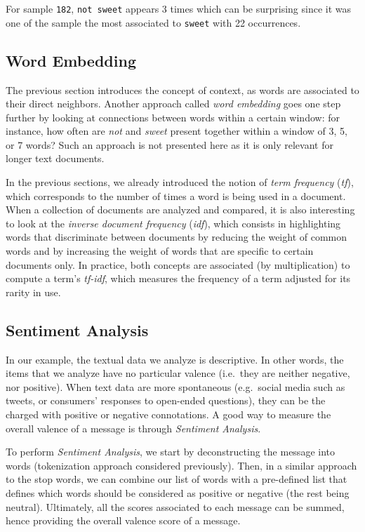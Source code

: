 \documentclass[
]{book}
\begin{document}
For sample \texttt{182}, \texttt{not\ sweet} appears 3 times which can be surprising since it was one of the sample the most associated to \texttt{sweet} with 22 occurrences.

\hypertarget{word-embedding}{%
\subsection{Word Embedding}\label{word-embedding}}

The previous section introduces the concept of context, as words are associated to their direct neighbors. Another approach called \emph{word embedding} goes one step further by looking at connections between words within a certain window: for instance, how often are \emph{not} and \emph{sweet} present together within a window of 3, 5, or 7 words? Such an approach is not presented here as it is only relevant for longer text documents.

In the previous sections, we already introduced the notion of \emph{term frequency} (\emph{tf}), which corresponds to the number of times a word is being used in a document. When a collection of documents are analyzed and compared, it is also interesting to look at the \emph{inverse document frequency} (\emph{idf}), which consists in highlighting words that discriminate between documents by reducing the weight of common words and by increasing the weight of words that are specific to certain documents only. In practice, both concepts are associated (by multiplication) to compute a term's \emph{tf-idf}, which measures the frequency of a term adjusted for its rarity in use.

\hypertarget{sentiment-analysis}{%
\subsection{Sentiment Analysis}\label{sentiment-analysis}}

In our example, the textual data we analyze is descriptive. In other words, the items that we analyze have no particular valence (i.e.~they are neither negative, nor positive). When text data are more spontaneous (e.g.~social media such as tweets, or consumers' responses to open-ended questions), they can be the charged with positive or negative connotations. A good way to measure the overall valence of a message is through \emph{Sentiment Analysis}.

To perform \emph{Sentiment Analysis}, we start by deconstructing the message into words (tokenization approach considered previously). Then, in a similar approach to the stop words, we can combine our list of words with a pre-defined list that defines which words should be considered as positive or negative (the rest being neutral). Ultimately, all the scores associated to each message can be summed, hence providing the overall valence score of a message.
\end{document}
